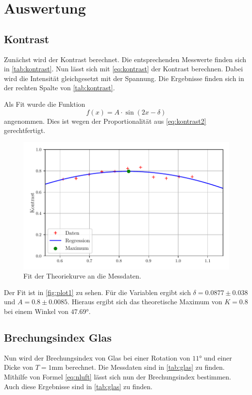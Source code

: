 \section{Auswertung}
\label{sec:Auswertung}

\subsection{Kontrast}
Zunächst wird der Kontrast berechnet.
Die entsprechenden Messwerte finden sich in \autoref{tab:kontrast}.
Nun lässt sich mit \autoref{eq:kontrast} der Kontrast berechnen. Dabei wird die Intensität gleichgesetzt mit der Spannung.
Die Ergebnisse finden sich in der rechten Spalte von \autoref{tab:kontrast}.

Als Fit wurde die Funktion 
\begin{equation*}
    f(x) = A \cdot \sin(2 x - \delta)
\end{equation*}
angenommen. Dies ist wegen der Proportionalität aus \autoref{eq:kontrast2} gerechtfertigt.
\begin{figure}
    \centering
    \includegraphics[width = 0.7 \linewidth]{build/Kontrast.pdf}
    \caption{Fit der Theoriekurve an die Messdaten.}
    \label{fig:plot1}
\end{figure}
Der Fit ist in \autoref{fig:plot1} zu sehen.
Für die Variablen ergibt sich $\delta = 0.0877 \pm 0.038$ und $A = 0.8 \pm 0.0085$.
Hieraus ergibt sich das theoretische Maximum von $K = 0.8$ bei einem Winkel von $47.69°$.

\subsection{Brechungsindex Glas}
Nun wird der Brechungsindex von Glas bei einer Rotation von $11°$ und einer Dicke von $T = 1 \unit{\milli\meter}$ berechnet.
Die Messdaten sind in \autoref{tab:glas} zu finden.
Mithilfe von Formel \autoref{eq:nluft} lässt sich nun der Brechungsindex bestimmen.
Auch diese Ergebnisse sind in \autoref{tab:glas} zu finden.


